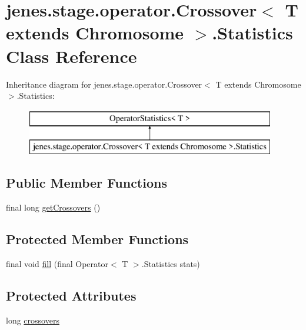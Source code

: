 \hypertarget{classjenes_1_1stage_1_1operator_1_1_crossover_3_01_t_01extends_01_chromosome_01_4_1_1_statistics}{\section{jenes.\-stage.\-operator.\-Crossover$<$ T extends Chromosome $>$.Statistics Class Reference}
\label{classjenes_1_1stage_1_1operator_1_1_crossover_3_01_t_01extends_01_chromosome_01_4_1_1_statistics}
}
Inheritance diagram for jenes.\-stage.\-operator.\-Crossover$<$ T extends Chromosome $>$.Statistics\-:\begin{figure}[H]
\begin{center}
\leavevmode
\includegraphics[height=2.000000cm]{classjenes_1_1stage_1_1operator_1_1_crossover_3_01_t_01extends_01_chromosome_01_4_1_1_statistics}
\end{center}
\end{figure}
\subsection*{Public Member Functions}
\begin{DoxyCompactItemize}
\item 
final long \hyperlink{classjenes_1_1stage_1_1operator_1_1_crossover_3_01_t_01extends_01_chromosome_01_4_1_1_statistics_a6181ee46b3e760f5d440e758d95db04b}{get\-Crossovers} ()
\end{DoxyCompactItemize}
\subsection*{Protected Member Functions}
\begin{DoxyCompactItemize}
\item 
final void \hyperlink{classjenes_1_1stage_1_1operator_1_1_crossover_3_01_t_01extends_01_chromosome_01_4_1_1_statistics_ae352590e85b1d1d821b0912a770f257a}{fill} (final Operator$<$ T $>$.Statistics stats)
\end{DoxyCompactItemize}
\subsection*{Protected Attributes}
\begin{DoxyCompactItemize}
\item 
long \hyperlink{classjenes_1_1stage_1_1operator_1_1_crossover_3_01_t_01extends_01_chromosome_01_4_1_1_statistics_abf1983cc628b3283b942dc68cc871bbc}{crossovers}
\end{DoxyCompactItemize}


